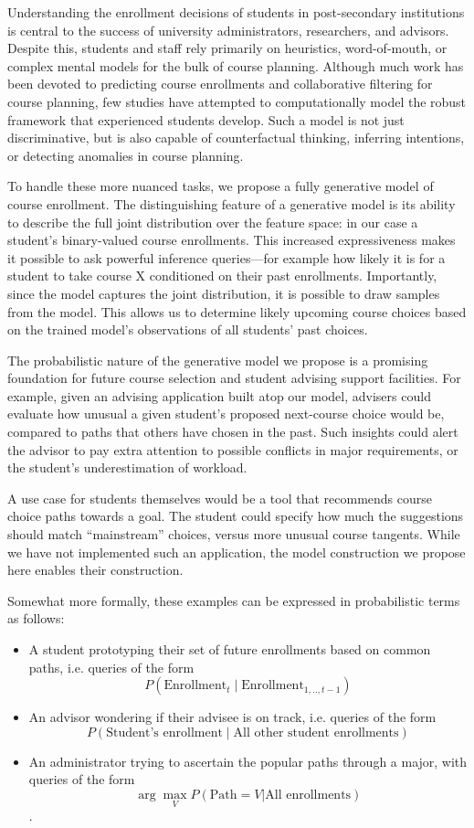 \documentclass{edm_template}
\begin{document}
Understanding the enrollment decisions of students in post-secondary institutions is central to the success of university administrators, researchers, and advisors. Despite this, students and staff rely primarily on heuristics, word-of-mouth, or complex mental models for the bulk of course planning. Although much work has been devoted to predicting course enrollments and collaborative filtering for course planning, few studies have attempted to computationally model the robust framework that experienced students develop. Such a model is not just discriminative, but is also capable of counterfactual thinking, inferring intentions, or detecting anomalies in course planning.

To handle these more nuanced tasks, we propose a fully generative model of course enrollment. The distinguishing feature of a generative model is its ability to describe the full joint distribution over the feature space: in our case a student's binary-valued course enrollments. This increased expressiveness makes it possible to ask powerful inference queries---for example how likely it is for a student to take course X conditioned on their past enrollments. Importantly, since the model captures the joint distribution, it is possible to draw samples from the model. This allows us to determine likely upcoming course choices based on the trained model's observations of all students' past choices.

The probabilistic nature of the generative model we propose is a promising foundation for future course selection and student advising support facilities. For example, given an advising application built atop our model, advisers could evaluate how unusual a given student's proposed next-course choice would be, compared to paths that others have chosen in the past. Such insights could alert the advisor to pay extra attention to possible conflicts in major requirements, or the student's underestimation of workload.

A use case for students themselves would be a tool that recommends course choice paths towards a goal. The student could specify how much the suggestions should match ``mainstream'' choices, versus more unusual course tangents. While we have not implemented such an application, the model construction we propose here enables their construction.

Somewhat more formally, these examples can be expressed in probabilistic terms as follows:

\begin{itemize}[noitemsep,topsep=0pt]
	\item A student prototyping their set of future enrollments based on common paths, i.e. queries of the form
	$$P(\text{Enrollment}_t \mid \text{Enrollment}_{1,..,t-1})$$ 
	\item An advisor wondering if their advisee is on track, i.e. queries of the form
	$$P(\text{Student's enrollment} \mid \text{All other student enrollments})$$
    \item An administrator trying to ascertain the popular paths through a major, with queries of the form
	$$\arg\max_{V} P(\text{Path} = V | \text{All enrollments})$$.
\end{itemize}
\end{document}
